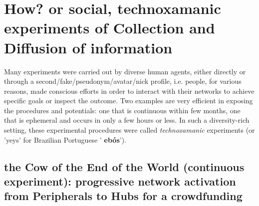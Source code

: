 \documentclass[a4paper]{article}
\begin{document}
\section{How? or social, technoxamanic experiments of Collection and Diffusion of information}
Many experiments were carried out by diverse human agents, either directly or
through a second/fake/pseudonym/avatar/nick profile, i.e. people, for various
reasons, made conscious efforts in order to interact with their networks to
achieve specific goals or inspect the outcome.  Two examples are very efficient
in exposing the procedures and potentials: one that is continuous within few
months, one that is ephemeral and occurs in only a few hours or less.  In such
a diversity-rich setting, these experimental procedures were called
\emph{technoxamanic} experiments (or 'yeys' for Brazilian Portuguese '{\bf
ebós}').

\subsection{the Cow of the End of the World (continuous experiment):
progressive network activation from Peripherals to Hubs for a crowdfunding}\label{cont}
\end{document}
